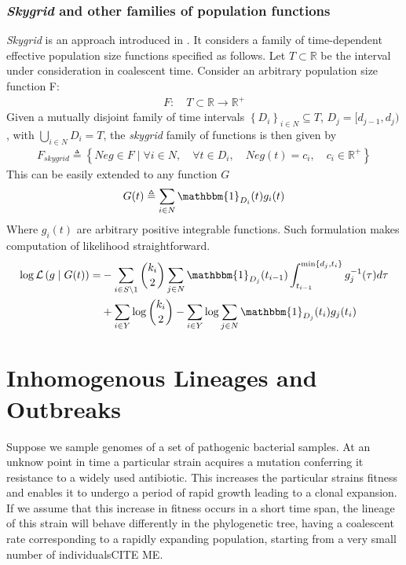 \documentclass{report}
\newcommand{\R}{\mathbb{R}}
\newcommand{\CITEMISSING}{\colorbox{BurntOrange}{CITE ME}}
\theoremstyle{definition}
\begin{document}
\subsubsection{\textit{Skygrid} and other families of population functions}
\textit{Skygrid} is an approach introduced in \cite{gill_improving_2013}. It considers a family of time-dependent effective population size functions specified as follows. Let $T\subset\R$ be the interval under consideration in coalescent time. Consider an arbitrary population size function F:
\begin{gather}
  F:\quad T\subset\R \rightarrow \R^+
\end{gather}
Given a mutually disjoint family of time intervals $\left\{D_i\right\}_{i\in N}\subseteq T$, $D_j = [d_{j-1}, d_{j})$,  with $\bigcup\limits_{i\in N} D_i = T$, the \textit{skygrid} family of functions is then given by 
\begin{gather}
F_{skygrid}\triangleq\left\{Neg\in F\mid\forall i\in N,\quad \forall t \in D_i,\quad Neg(t) = c_i,\quad c_i\in\R^+\right\}
\end{gather}
This can be easily extended to any function $G$
\begin{gather}
 G(t)\triangleq\sum_{i\in N}{\mathbbm{1}_{D_i}(t)g_i(t)}
\end{gather}
Where $g_i(t)$ are arbitrary positive integrable functions.
Such formulation makes computation of likelihood straightforward.
\begin{gather}
\begin{aligned}
\log\mathcal{L}\left(g\mid G(t)\right) 
=& -\sum_{i\in S\setminus 1}{
\binom{k_i}{2}\sum_{j\in N}{\mathbbm{1}_{D_j}(t_{i-1})
\int_{t_{i-1}}^{\min\{d_j, t_i\}}{g^{-1}_j(\tau)d\tau}}}\\
&+\sum_{i\in Y}{\log\binom{k_i}{2}} - \sum_{i\in Y}{\log{\sum_{j\in N}{\mathbbm{1}_{D_j}(t_i)g_j(t_i)}}}
\end{aligned}
\end{gather}
\section{Inhomogenous Lineages and Outbreaks}\label{section:multi}
Suppose we sample genomes of a set of pathogenic bacterial samples. 
At an unknow point in time a particular strain acquires a mutation conferring it resistance to a widely used antibiotic. This increases the particular strains fitness and enables it to undergo a period of rapid growth leading to a clonal expansion. If we assume that this increase in fitness occurs in a short time span, the lineage of this strain will behave differently in the phylogenetic tree, having a coalescent rate corresponding to a rapidly expanding population, starting from a very small number of individuals\CITEMISSING.\\
\end{document}
